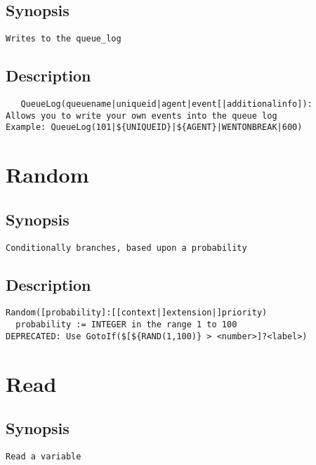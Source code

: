\subsection{Synopsis}
\begin{verbatim}
Writes to the queue_log
\end{verbatim}
\subsection{Description}
\begin{verbatim}
   QueueLog(queuename|uniqueid|agent|event[|additionalinfo]):
Allows you to write your own events into the queue log
Example: QueueLog(101|${UNIQUEID}|${AGENT}|WENTONBREAK|600)

\end{verbatim}


\section{Random}
\subsection{Synopsis}
\begin{verbatim}
Conditionally branches, based upon a probability
\end{verbatim}
\subsection{Description}
\begin{verbatim}
Random([probability]:[[context|]extension|]priority)
  probability := INTEGER in the range 1 to 100
DEPRECATED: Use GotoIf($[${RAND(1,100)} > <number>]?<label>)

\end{verbatim}


\section{Read}
\subsection{Synopsis}
\begin{verbatim}
Read a variable
\end{verbatim}
